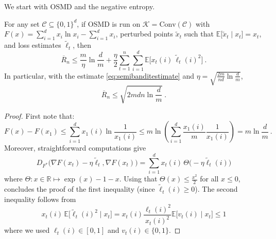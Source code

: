 \documentclass[11pt]{hackednow}
\newcommand{\E}{\mathbb{E}}
\newcommand{\R}{\mathbb{R}}
\newcommand{\cC}{\mathcal{C}}
\newcommand{\cK}{\mathcal{K}}
\newcommand{\oR}{\overline{R}}
\renewcommand{\tilde}{\widetilde}
\newcommand{\conv}{\mathrm{Conv}}
\begin{document}
%

We start with OSMD and the negative entropy.
%
\begin{theorem}
\label{th:osmdnegent}
For any set $\cC\subseteq\{0,1\}^d$, if OSMD is run on $\cK=\conv(\cC)$ with $F(x) = \sum_{i=1}^d x_i \ln x_i - \sum_{i=1}^d x_i$, perturbed points $\tilde{x}_t$ such that $\E\bigl[\tilde{x}_t \mid x_t\bigr] = x_t$, and loss estimates $\tilde{\ell}_t$, then
$$\oR_n \leq \frac{m}{\eta}\ln \frac{d}{m} + \frac{\eta}{2} \sum_{t=1}^n \sum_{i=1}^d \E\bigl[x_t(i)\,\tilde{\ell}_t(i)^2\bigr]~.$$
In particular, with the estimate \eqref{eq:semibanditestimate} and $\eta= \sqrt{\frac{2m}{nd}\ln\frac{d}{m}}$,
$$\oR_n \leq  \sqrt{2 m d n \ln \frac{d}{m}}~.$$
\end{theorem}
%
\begin{proof}
First note that:
$$F(x) - F(x_1) \leq \sum_{i=1}^d x_1(i) \ln \frac{1}{x_1(i)} \leq m \ln \left( \sum_{i=1}^d \frac{x_1(i)}{m} \frac{1}{x_1(i)}\right) = m \ln \frac{d}{m}~.$$
Moreover, straightforward computations give
$$D_{F^*}\bigg(\nabla F(x_t) - \eta \tilde{\ell}_t, \nabla F(x_t)\bigg) =\sum_{i=1}^d x_{t}(i)\, \Theta\bigl(- \eta \tilde{\ell}_t(i)\bigr)$$
where $\Theta : x \in \R \mapsto \exp(x) - 1 - x$. Using that $\Theta(x) \leq \frac{x^2}{2}$ for all $x \leq 0$, concludes the proof of the first inequality (since $\tilde{\ell}_t(i) \geq 0$). The second inequality follows from
\[
    x_t(i)\,\E\bigl[\tilde{\ell}_t(i)^2 \mid x_t\bigr] = x_t(i)\frac{\ell_t(i)^2}{x_t(i)^2}\E\bigl[v_t(i) \mid x_t\bigr] \le 1
\]
where we used $\ell_t(i) \in [0,1]$ and $v_t(i) \in \{0,1\}$.
\end{proof}
\end{document}
